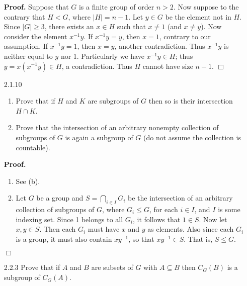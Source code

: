 \documentclass[9pt]{article}
\newcommand{\qed}{\hfill \ensuremath{\Box}}
\newcommand{\D}{\displaystyle}
\begin{document}
\begin{enumerate}
      \textbf{Proof.} Suppose that $G$ is a finite group of order $n > 2$. Now
      suppose to the contrary that $H < G$, where $|H| = n - 1$. Let $y \in G$
      be the element not in $H$. Since $|G| \ge 3$, there exists an
      $x \in H$ such that $x \neq 1$ (and $x \neq y$). Now consider the element
      $x^{-1}y$. If $x^{-1}y = y$, then $x = 1$, contrary to our assumption. If
      $x^{-1}y = 1$, then $x = y$, another contradiction. Thus $x^{-1}y$ is
      neither equal to $y$ nor 1. Particularly we have $x^{-1}y \in H$; thus
      $y = x(x^{-1}y) \in H$, a contradiction. Thus $H$ cannot have size
      $n - 1$. \qed
   \item[2.1.10]  \begin{enumerate}
                     \item Prove that if $H$ and $K$ are subgroups of $G$ then
                           so is their intersection $H \cap K$.
                     \item Prove that the intersection of an arbitrary nonempty
                           collection of subgroups of $G$ is again a subgroup of
                           $G$ (do not assume the collection is countable).
                  \end{enumerate}

      \textbf{Proof.}

      \begin{enumerate}
         \item See (b).
         \item Let $G$ be a group and $S = \D\bigcap_{i \in I}G_i$ be the
               intersection of an arbitrary collection of subgroups of $G$,
               where $G_i \le G$, for each $i \in I$, and $I$ is some indexing   
               set. Since 1 belongs to all $G_i$, it follows that $1 \in S$. Now
               let $x, y \in S$. Then each $G_i$ must have $x$ and $y$ as
               elements. Also since each $G_i$ is a group, it must also contain
               $xy^{-1}$, so that $xy^{-1} \in S$. That is, $S \le G$.
      \end{enumerate} \qed
   \item[2.2.3]   Prove that if $A$ and $B$ are subsets of $G$ with
                  $A \subseteq B$ then $C_G(B)$ is a subgroup of $C_G(A)$.


\end{enumerate}
\end{document}
